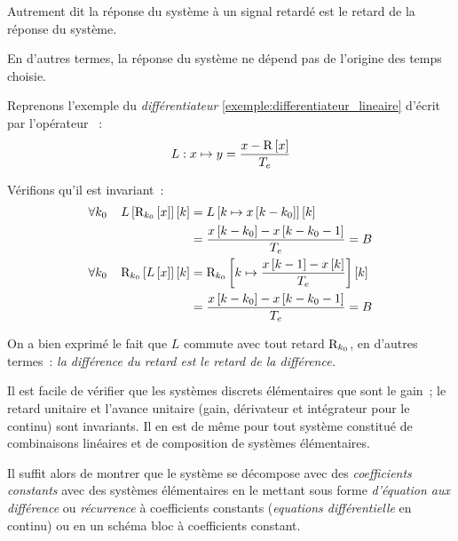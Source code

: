 Autrement dit \og{} la réponse du système à un signal retardé est le
retard de la réponse du système.\fg{} 

En d'autres termes, la réponse du système ne dépend pas de l'origine
des temps choisie.
        
\begin{exemple}
  Reprenons l'exemple du \emph{différentiateur} \ref{exemple:differentiateur_lineaire} d'écrit par
  l'opérateur ~: $$L : x \mapsto y=\frac{x-\mathrm{R}\left[x\right]}{T_e}$$
  
  Vérifions qu'il est invariant~:
  \begin{eqnarray*}
    \forall k_0 \;\;\;\; L\left[\mathrm{R}_{k_0}\left[x\right]\right]\left[k\right] &= L\left[k\mapsto x\left[k-k_0\right]\right]\left[k\right]\\
                                                   &= \frac{x\left[k-k_0\right]-x\left[k-k_0-1\right]}{T_e} = B\\
    \forall k_0 \;\;\;\; \mathrm{R}_{k_0}\left[L\left[x\right]\right]\left[k\right] &= \mathrm{R}_{k_0}\left[k\mapsto \frac{x\left[k-1\right]-x\left[k\right]}{T_e}\right]\left[k\right]\\
                                                   &= \frac{x\left[k-k_0\right]-x\left[k-k_0-1\right]}{T_e} = B
  \end{eqnarray*}
  
  On a bien exprimé le fait que $L$ commute avec tout retard
  $\mathrm{R}_{k_0}$, en d'autres termes~: \emph{la différence du retard est le retard de la différence.}
\end{exemple}


\begin{remarque}
  Il est facile de vérifier que les systèmes discrets élémentaires que
  sont le gain~; le retard unitaire et l'avance unitaire (gain,
  dérivateur et intégrateur pour le continu) sont invariants.  Il en
  est de même pour tout système constitué de combinaisons linéaires
  et de composition de systèmes élémentaires.

  Il suffit alors de montrer que le système se décompose avec des
  \emph{coefficients constants} avec des systèmes élémentaires en le
  mettant sous forme \emph{d'équation aux différence} ou
  \emph{récurrence} à coefficients constants (\emph{equations
    différentielle} en continu) ou en un schéma bloc à coefficients
  constant.
\end{remarque}



